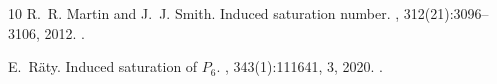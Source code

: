 \documentclass[11pt]{article}
\theoremstyle{definition}
\theoremstyle{remark}
\begin{document}
\begin{thebibliography}{10}
R.~R. Martin and J.~J. Smith.
\newblock Induced saturation number.
, 312(21):3096--3106, 2012.
\newblock \href {https://doi.org/10.1016/j.disc.2012.06.015}
  {}.

E.~R\"aty.
\newblock Induced saturation of {$P_6$}.
, 343(1):111641, 3, 2020.
\newblock \href {https://doi.org/10.1016/j.disc.2019.111641}
  {}.

\end{thebibliography}
\end{document}
